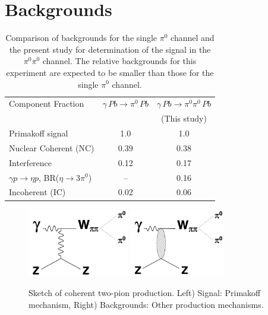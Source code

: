 
\section{Backgrounds}

\begin{table}[t]
\caption{Comparison of backgrounds for the single $\pi^0$ channel and the present study for 
determination of the signal in the $\pi^0\pi^0$ channel. The relative backgrounds for this experiment
are expected to be smaller than those for the single $\pi^0$ channel.
\label{tab:backgrounds}
}
\begin{center}
\begin{tabular}{|l|c|c|}
\hline
\hline 
 Component Fraction & $\gamma\,Pb\to \pi^0\, Pb$  & $\gamma\,Pb\to \pi^0\pi^0\, Pb$ \\  
                    &                            & (This study) \\  \hline
  Primakoff signal  &   1.0   & 1.0   \\ \hline 
  Nuclear Coherent (NC)  & 0.39  &   0.38   \\ \hline 
  Interference  & 0.12  &  0.17   \\ \hline 
  $\gamma p \rightarrow \eta p$, BR($\eta \rightarrow 3\pi^0$)  &   -- & 0.16   \\ \hline 
  Incoherent (IC)  &   0.02  & 0.06  \\
  \hline   
  \hline
\end{tabular}
\end{center}
\end{table}



 \begin{figure}[tbh]
\begin{center}
\includegraphics[height=3cm,clip=true]{figures/Diagram_Primakoff.png} \hspace{1cm}
\includegraphics[height=3cm,clip=true]{figures/Diagram_hadronic.png}
\caption{Sketch of coherent two-pion production. Left) Signal: Primakoff mechanism, Right) Backgrounds: Other production mechanisms.
\label{fig:Diagram}}
\end{center}
\end{figure}


